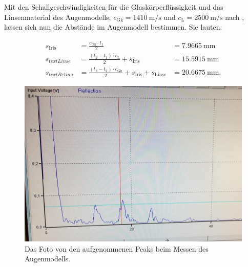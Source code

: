   \noindent Mit den Schallgeschwindigkeiten für die Glaskörperflüssigkeit und das Linsenmaterial des Augenmodells, $c_{\text{Gk}} = \SI{1410}{\metre\per\second}$ und
  $c_{\text{L}} = \SI{2500}{\metre\per\second}$ nach \cite{anleitung}, lassen sich nun die Abstände im Augenmodell bestimmen. Sie lauten:

  \begin{align*}
    s_{\text{Iris}}   &= \frac{c_{\text{Gk}} \cdot t_1}{2}                                              &= \SI{7.9665}{\milli\metre} \\
    s_{text{Linse}}   &= \frac{(t_2 - t_1) \cdot c_{\text{L}}}{2} + s_{\text{Iris}}                     &= \SI{15.5915}{\milli\metre} \\
    s_{text{Retina}}  &= \frac{(t_3 - t_2) \cdot c_{\text{Gk}}}{2} + s_{\text{Iris}} + s_{\text{Linse}} &= \SI{20.6675}{\milli\metre}.
  \end{align*}

  \begin{figure}[H]
    \centering
    \includegraphics[width=\textwidth]{content/foto_messwerte_auge.jpeg}
    \caption{Das Foto von den aufgenommenen Peaks beim Messen des Augenmodells.}
    \label{fig:augenpeaks}
  \end{figure}